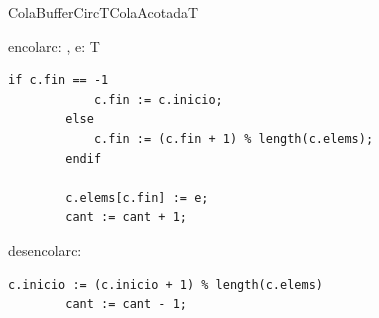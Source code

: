 \begin{module}{ColaBufferCirc}{T}{ColaAcotada}{T}



	\begin{proc}{encolar}{\Inout c: \moduletype, \In e: T}{}
		\begin{lstlisting}[numbers=none,frame=none]
		if c.fin == -1
			c.fin := c.inicio;
		else
			c.fin := (c.fin + 1) % length(c.elems);
		endif

		c.elems[c.fin] := e;
		cant := cant + 1;
		\end{lstlisting}
	\end{proc}

	\begin{proc}{desencolar}{\Inout c: \moduletype}{}
		\begin{lstlisting}[numbers=none,frame=none]
		c.inicio := (c.inicio + 1) % length(c.elems)
		cant := cant - 1;
		\end{lstlisting}
	\end{proc}

\end{module}


